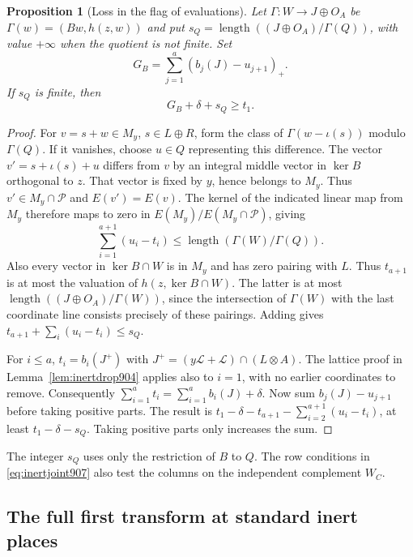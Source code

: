 \documentclass[a4paper,11pt]{article}
\newtheorem{proposition}{Proposition}[section]
\theoremstyle{definition}
\theoremstyle{remark}
\numberwithin{equation}{section}
\begin{document}
\begin{proposition}[Loss in the flag of evaluations]
\leavevmode\label{prop:inertloss907}
Let \(\Gamma:W\to J\oplus O_A\) be
\(\Gamma(w)=(Bw,h(z,w))\) and put
\(s_Q=\operatorname{length}((J\oplus O_A)/\Gamma(Q))\),
with value \(+\infty\) when the quotient is not finite. Set
\[
               G_B=\sum_{j=1}^a (b_j(J)-u_{j+1})_+ .
\]
If \(s_Q\) is finite, then
\begin{equation}
                           G_B+\delta+s_Q\ge t_1 .
 \label{eq:inertloss907}
\end{equation}
\end{proposition}
\begin{proof}
For \(v=s+w\in M_y\), \(s\in L\oplus R\), form the class of
\(\Gamma(w-\iota(s))\) modulo \(\Gamma(Q)\).
If it vanishes, choose \(u\in Q\) representing this difference.
The vector \(v'=s+\iota(s)+u\) differs from \(v\) by an
integral middle vector in \(\ker B\) orthogonal to \(z\).
That vector is fixed by \(y\), hence belongs to \(M_y\).
Thus \(v'\in M_y\cap\mathcal P\) and \(E(v')=E(v)\).
The kernel of the indicated linear map from \(M_y\) therefore
maps to zero in \(E(M_y)/E(M_y\cap\mathcal P)\), giving
\[
         \sum_{i=1}^{a+1}(u_i-t_i)
              \le\operatorname{length}(\Gamma(W)/\Gamma(Q)).
\]
Also every vector in \(\ker B\cap W\) is in \(M_y\) and has
zero pairing with \(L\). Thus \(t_{a+1}\) is at most the
valuation of \(h(z,\ker B\cap W)\). The latter is at most
\(\operatorname{length}((J\oplus O_A)/\Gamma(W))\), since
the intersection of \(\Gamma(W)\) with the last coordinate
line consists precisely of these pairings. Adding gives
\(t_{a+1}+\sum_i(u_i-t_i)\le s_Q\).

For \(i\le a\), \(t_i=b_i(J^+)\) with
\(J^+=(y\mathcal L+\mathcal L)\cap (L\otimes A)\).
The lattice proof in Lemma~\ref{lem:inertdrop904} applies also
to \(i=1\), with no earlier coordinates to remove.
Consequently \(\sum_{i=1}^a t_i=\sum_{i=1}^a b_i(J)+\delta\).
Now sum \(b_j(J)-u_{j+1}\) before taking positive parts.
The result is \(t_1-\delta-t_{a+1}
-\sum_{i=2}^{a+1}(u_i-t_i)\), at least \(t_1-\delta-s_Q\).
Taking positive parts only increases the sum.
\end{proof}

The integer \(s_Q\) uses only the restriction of \(B\) to \(Q\).
The row conditions in \eqref{eq:inertjoint907} also test the
columns on the independent complement \(W_C\).
\clearpage

\subsection{The full first transform at standard inert places}
\label{sec:inertfull908}
\end{document}
